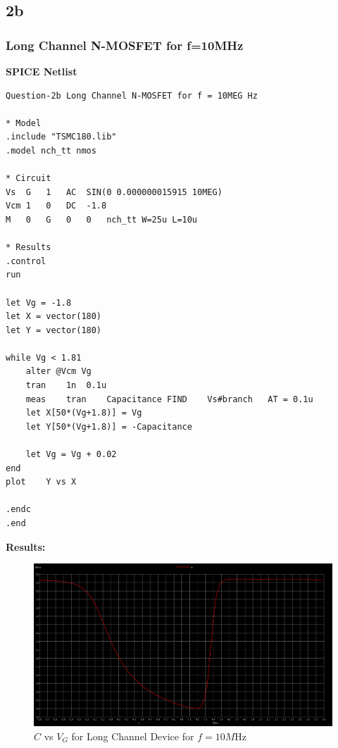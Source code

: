 \documentclass{article}
\begin{document}
\subsection{2b}
\subsubsection{Long Channel N-MOSFET for f=10MHz}
\textbf{SPICE Netlist}
\begin{lstlisting}
Question-2b Long Channel N-MOSFET for f = 10MEG Hz

* Model
.include "TSMC180.lib"
.model nch_tt nmos

* Circuit
Vs	G	1	AC	SIN(0 0.000000015915 10MEG)
Vcm	1	0	DC	-1.8
M	0	G	0	0	nch_tt W=25u L=10u

* Results
.control
run

let Vg = -1.8
let X = vector(180)
let Y = vector(180)

while Vg < 1.81
	alter @Vcm Vg
	tran	1n	0.1u		
	meas	tran	Capacitance	FIND	Vs#branch	AT = 0.1u
	let X[50*(Vg+1.8)] = Vg
	let Y[50*(Vg+1.8)] = -Capacitance

	let Vg = Vg + 0.02
end
plot	Y vs X

.endc
.end
\end{lstlisting}
\textbf{Results:}
\begin{figure}[!ht]
    \centering
    \includegraphics[scale=0.23]{Images/2blong1.png}
    \caption{$C$ vs $V_G$ for Long Channel Device for $f=10M$Hz}
\end{figure}
\end{document}
